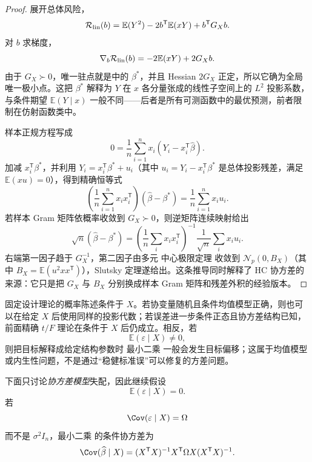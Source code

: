 \begin{proof}
展开总体风险，
\[
 \mathcal R_{\rm lin}(b)
 =\mathbb E(Y^2)-2b^{\mathsf T}\mathbb E(xY)
 +b^{\mathsf T}G_Xb.
\]
对 $b$ 求梯度，
\[
 \nabla_b\mathcal R_{\rm lin}(b)
 =-2\mathbb E(xY)+2G_Xb.
\]
由于 $G_X\succ0$，唯一驻点就是中的 $\beta^*$，并且 Hessian $2G_X$ 正定，所以它确为全局唯一极小点。这把 $\beta^*$ 解释为 $Y$ 在 $x$ 各分量张成的线性子空间上的 $L^2$ 投影系数，与条件期望 $\mathbb E(Y\mid x)$ 一般不同——后者是所有可测函数中的最优预测，前者限制在仿射函数类中。

样本正规方程写成
\[
 0
 =\frac1n\sum_{i=1}^nx_i(Y_i-x_i^{\mathsf T}\widehat\beta).
\]
加减 $x_i^{\mathsf T}\beta^*$，并利用 $Y_i=x_i^{\mathsf T}\beta^*+u_i$（其中 $u_i=Y_i-x_i^{\mathsf T}\beta^*$ 是总体投影残差，满足 $\mathbb E(xu)=0$），得到精确恒等式
\[
 \left(\frac1n\sum_{i=1}^nx_ix_i^{\mathsf T}\right)
 (\widehat\beta-\beta^*)
 =\frac1n\sum_{i=1}^nx_iu_i.
\]
若样本 Gram 矩阵依概率收敛到 $G_X\succ0$，则逆矩阵连续映射给出
\[
 \sqrt n(\widehat\beta-\beta^*)
 =\left(\frac1n\sum_i x_ix_i^{\mathsf T}\right)^{-1}
 \frac1{\sqrt n}\sum_i x_iu_i.
\]
右端第一因子趋于 $G_X^{-1}$，第二因子由多元 中心极限定理 收敛到 $\mathcal N_p(0,B_X)$（其中 $B_X=\mathbb E(u^2xx^{\mathsf T})$），Slutsky 定理遂给出。这条推导同时解释了 HC 协方差的来源：它只是把 $G_X$ 与 $B_X$ 分别换成样本 Gram 矩阵和残差外积的经验版本。
\end{proof}


\begin{note}[条件精确推断与均值失配]
固定设计理论的概率陈述条件于 $X$。若协变量随机且条件均值模型正确，则也可以在给定 $X$ 后使用同样的投影代数；若误差进一步条件正态且协方差结构已知，前面精确 $t/F$ 理论在条件于 $X$ 后仍成立。相反，若
\[
 \mathbb E(\varepsilon\mid X)\ne0,
\]
则把目标解释成给定结构参数时 最小二乘 一般会发生目标偏移；这属于均值模型或内生性问题，不是通过“稳健标准误”可以修复的方差问题。
\end{note}

\begin{proposition}
下面只讨论\emph{协方差模型}失配，因此继续假设
\[
 \mathbb E(\varepsilon\mid X)=0.
\]
若
\[
 \Cov(\varepsilon\mid X)=\Omega
\]
而不是 $\sigma^2I_n$，最小二乘 的条件协方差为
\[
 \Cov(\widehat\beta\mid X)
 =(X^{\mathsf T}X)^{-1}
 X^{\mathsf T}\Omega X
 (X^{\mathsf T}X)^{-1}.
\]
\end{proposition}

